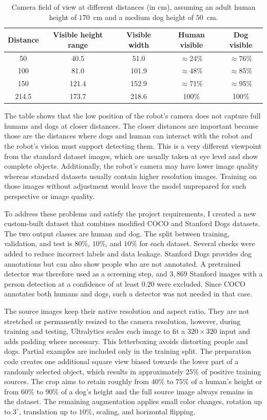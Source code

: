 \documentclass[a4paper,12pt]{report}
\begin{document}
\begin{table}[h]
\centering
\begin{tabular}{|c|c|c|c|c|}
\hline
\textbf{Distance} & \textbf{Visible height range} & \textbf{Visible width} & \textbf{Human visible}
& \textbf{Dog visible} \\
\hline
50  & 40.5  & 51.0  & $\approx$24\% & $\approx$76\%\\
100 & 81.0  & 101.9 & $\approx$48\% & $\approx$85\%\\
150 & 121.4 & 152.9 & $\approx$71\% & $\approx$95\%\\
214.5 & 173.7 & 218.6 & 100\% & 100\%\\
\hline
\end{tabular}
\caption{Camera field of view at different distances (in cm), assuming an adult human height of
$170$~cm
and a medium dog height of $50$~cm.}
\label{tab:camera-fov}
\end{table}

The table shows that the low position of the robot's camera does not capture full humans and dogs
at closer distances. The closer distances are important because those are the distances where dogs
and human can interact with the robot and the robot's vision must support detecting them. This is
a very different viewpoint from the standard dataset images, which are usually taken at eye level
and show complete objects. Additionally, the robot's camera may have lower image quality whereas
standard datasets usually contain higher resolution images. Training on those images without
adjustment would leave the model unprepared for such perspective or image quality.

To address these problems and satisfy the project requirements, I created a new custom-built dataset
that combines modified COCO and Stanford Dogs datasets. The two output classes are human and dog.
The split between training, validation, and test is $80\%$, $10\%$, and $10\%$ for each dataset.
Several checks were added to reduce incorrect labels and data leakage. Stanford Dogs provides dog
annotations but can also show people who are not annotated. A pretrained detector was therefore used
as a screening step, and $3,869$ Stanford images with a person detection at a confidence of at least
$0.20$ were excluded. Since COCO annotates both humans and dogs, such a detector was not needed in
that case.

The source images keep their native resolution and aspect ratio. They are not stretched or
permanently resized to the camera resolution, however, during training and testing, Ultralytics
scales each image to fit a $320 \times 320$ input and adds padding where necessary. This
letterboxing avoids distorting people and dogs. Partial examples are included only in the training
split. The preparation code creates one additional square view biased towards the lower part of a
randomly selected object, which results in approximately $25\%$ of positive training sources. The
crop aims to retain roughly from $40\%$ to $75\%$ of a human's height or from $60\%$ to $90\%$ of
a dog's height and the full source image always remains in the dataset. The remaining augmentation
applies small color changes, rotation up to $3^\circ$, translation up to $10\%$, scaling, and
horizontal flipping.
\end{document}
